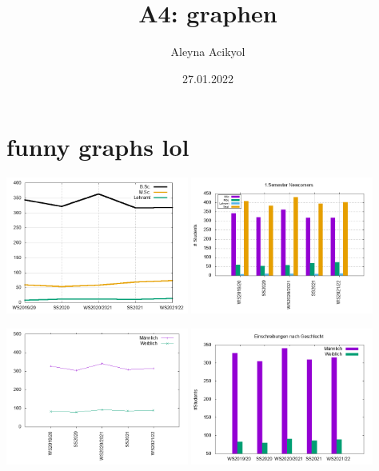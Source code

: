 \documentclass[12pt,fleqn]{article}
\title{A4: graphen}
\author{Aleyna Acikyol}
\date{27.01.2022}
\begin{document}
\maketitle
\section*{funny graphs lol}


\includegraphics[width=6cm]{last.png} 
\includegraphics[width=6cm]{newbies.png} 

\includegraphics[width=6cm]{mw.png} 
\includegraphics[width=6cm]{mwhisto.png} 
\end{document}
